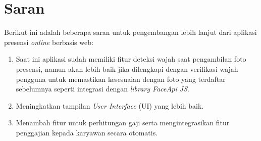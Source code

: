 \section{Saran}
Berikut ini adalah beberapa saran untuk pengembangan lebih lanjut dari aplikasi presensi \textit{online} berbasis web:
\begin{enumerate}
    \item Saat ini aplikasi sudah memiliki fitur deteksi wajah saat pengambilan foto presensi, namun akan lebih baik jika dilengkapi dengan verifikasi wajah pengguna untuk memastikan kesesuaian dengan foto yang terdaftar sebelumnya seperti integrasi dengan \textit{library FaceApi JS}.
    \item Meningkatkan tampilan \textit{User Interface} (UI) yang lebih baik.
    \item Menambah fitur untuk perhitungan gaji serta mengintegrasikan fitur penggajian kepada karyawan secara otomatis.
\end{enumerate}
